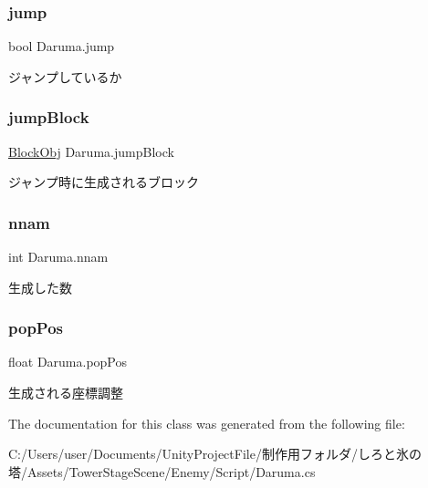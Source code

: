 \subsubsection{\texorpdfstring{jump}{jump}}
{\footnotesize\ttfamily bool Daruma.\+jump\hspace{0.3cm}{\ttfamily [private]}}



ジャンプしているか 

\mbox{\label{class_daruma_aa43a4cc9bcf6dc6366e1a57d90b5fc20}} 
\subsubsection{\texorpdfstring{jump\+Block}{jumpBlock}}
{\footnotesize\ttfamily \hyperlink{class_block_obj}{Block\+Obj} Daruma.\+jump\+Block\hspace{0.3cm}{\ttfamily [private]}}



ジャンプ時に生成されるブロック 

\mbox{\label{class_daruma_a0451e247a5f87992857b43cb250f8769}} 
\subsubsection{\texorpdfstring{nnam}{nnam}}
{\footnotesize\ttfamily int Daruma.\+nnam\hspace{0.3cm}{\ttfamily [private]}}



生成した数 

\mbox{\label{class_daruma_af120578e4293ca5df91bbb09e79008a7}} 
\subsubsection{\texorpdfstring{pop\+Pos}{popPos}}
{\footnotesize\ttfamily float Daruma.\+pop\+Pos\hspace{0.3cm}{\ttfamily [private]}}



生成される座標調整 



The documentation for this class was generated from the following file\+:\begin{DoxyCompactItemize}
\item 
C\+:/\+Users/user/\+Documents/\+Unity\+Project\+File/制作用フォルダ/しろと氷の塔/\+Assets/\+Tower\+Stage\+Scene/\+Enemy/\+Script/Daruma.\+cs\end{DoxyCompactItemize}
